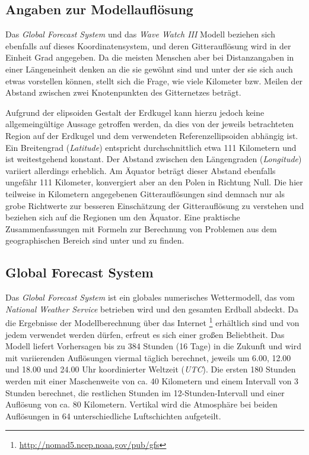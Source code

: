 \subsection{Angaben zur Modellauflösung}
Das \textit{Global Forecast System} und das \textit{Wave Watch III}
Modell beziehen sich ebenfalls auf dieses Koordinatensystem, und deren
Gitterauflösung wird in der Einheit Grad angegeben. Da die meisten
Menschen aber bei Distanzangaben in einer Längeneinheit denken an die
sie gewöhnt sind und unter der sie sich auch etwas vorstellen können,
stellt sich die Frage, wie viele Kilometer bzw. Meilen der Abstand
zwischen zwei Knotenpunkten des Gitternetzes beträgt.

Aufgrund der elipsoiden Gestalt der Erdkugel kann hierzu jedoch keine
allgemeingültige Aussage getroffen werden, da dies von der jeweils
betrachteten Region auf der Erdkugel und dem verwendeten
Referenzellipsoiden abhängig ist. Ein Breitengrad (\textit{Latitude})
entspricht durchschnittlich etwa 111 Kilometern und ist weitestgehend
konstant. Der Abstand zwischen den Längengraden (\textit{Longitude})
variiert allerdings erheblich. Am Äquator beträgt dieser Abstand
ebenfalls ungefähr 111 Kilometer, konvergiert aber an den Polen in
Richtung Null. Die hier teilweise in Kilometern angegebenen
Gitterauflösungen sind demnach nur als grobe Richtwerte zur besseren
Einschätzung der Gitterauflösung zu verstehen und beziehen sich auf
die Regionen um den Äquator. Eine praktische Zusammenfassungen mit
Formeln zur Berechnung von Problemen aus dem geographischen Bereich
sind unter \cite{aviation} und \cite{movable_type_scripts} zu finden.

\subsection{Global Forecast System}
Das \textit{Global Forecast System} ist ein globales numerisches
Wettermodell, das vom \textit{National Weather Service} betrieben wird
und den gesamten Erdball abdeckt. Da die Ergebnisse der
Modellberechnung über das Internet
\footnote{\url{http://nomad5.ncep.noaa.gov/pub/gfs}} erhältlich sind
und von jedem verwendet werden dürfen, erfreut es sich einer großen
Beliebtheit. Das Modell liefert Vorhersagen bis zu 384 Stunden (16
Tage) in die Zukunft und wird mit variierenden Auflösungen viermal
täglich berechnet, jeweils um 6.00, 12.00 und 18.00 und 24.00 Uhr
koordinierter Weltzeit (\textit{UTC}). Die ersten 180 Stunden werden
mit einer Maschenweite von ca. 40 Kilometern und einem Intervall von 3
Stunden berechnet, die restlichen Stunden im 12-Stunden-Intervall und
einer Auflösung von ca. 80 Kilometern. Vertikal wird die Atmosphäre
bei beiden Auflösungen in 64 unterschiedliche Luftschichten
aufgeteilt.

